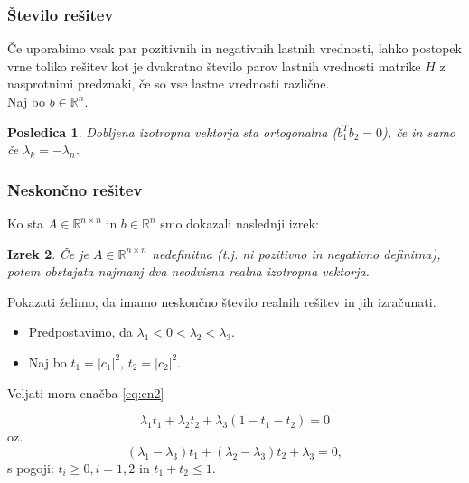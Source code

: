 \documentclass{beamer}
\newcommand{\abs}[1]{ \left\lvert#1\right\rvert}
\newcommand{\R}{\mathbb R}
\newtheorem{izrek}{Izrek}
\newtheorem{posledica}[izrek]{Posledica}
\begin{document}
\begin{frame}
\frametitle{Število rešitev}
Če uporabimo vsak par pozitivnih in negativnih lastnih vrednosti, lahko postopek vrne toliko rešitev kot je dvakratno število parov lastnih vrednosti matrike $H$ z nasprotnimi predznaki, če so vse lastne vrednosti različne.\medskip \\ Naj bo $b\in\R^n$.\pause
\begin{posledica}%
Dobljena izotropna vektorja sta ortogonalna ($b_1 ^T b_2=0$), če in samo če $\lambda_k=-\lambda_n$.
\end{posledica}
\end{frame}
\begin{frame}
\frametitle{Neskončno rešitev}
Ko sta $A\in\R^{n\times n}$ in $b\in\R^n$ smo dokazali naslednji izrek: \medskip
\begin{izrek}
Če je $A\in\R^{n\times n}$ nedefinitna (t.j. ni pozitivno in negativno definitna), potem obstajata najmanj dva neodvisna realna izotropna vektorja.
\end{izrek}\pause \medskip

Pokazati želimo, da imamo neskončno število realnih rešitev in jih izračunati. 

\end{frame}
\begin{frame}
\begin{itemize}
\item Predpostavimo, da $\lambda_1 <0<\lambda_2<\lambda_3$.\pause
\item Naj bo $t_1=\abs{c_1}^2$, $t_2=\abs{c_2}^2$.\pause
\end{itemize}
Veljati mora enačba \eqref{eq:en2}
\begin{block}{}
\begin{equation*}%
\lambda_1 t_1 +\lambda_2 t_2 +\lambda_3 (1- t_1 -t_2)=0
\end{equation*} oz.
\begin{equation*}
(\lambda_1 -\lambda_3)t_1 +(\lambda_2 -\lambda_3)t_2 +\lambda_3=0,
\end{equation*}
s pogoji: $t_i \ge 0, i=1,2$ in $t_1 +t_2\le1$.
\end{block}{}
\end{frame}
\end{document}
